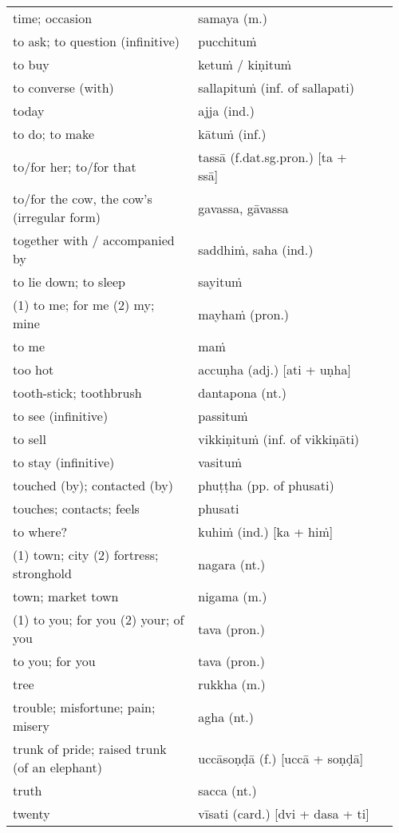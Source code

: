 \documentclass[a5paper]{memoir}
\begin{document}
\begin{longtable}{L{0.48\linewidth} L{0.48\linewidth} H}
time; occasion & samaya (m.) & \\[0pt]
to ask; to question (infinitive) & pucchituṁ & \\[0pt]
to buy & ketuṁ / kiṇituṁ & \\[0pt]
to converse (with) & sallapituṁ (inf. of sallapati) & \\[0pt]
today & ajja (ind.) & \\[0pt]
to do; to make & kātuṁ (inf.) & \\[0pt]
to/for her; to/for that & tassā (f.dat.sg.pron.) [ta + ssā] & \\[0pt]
to/for the cow, the cow's (irregular form) & gavassa, gāvassa & \\[0pt]
together with / accompanied by & saddhiṁ, saha (ind.) & \\[0pt]
to lie down; to sleep & sayituṁ & \\[0pt]
(1) to me; for me (2) my; mine & mayhaṁ (pron.) & \\[0pt]
to me & maṁ & \\[0pt]
too hot & accuṇha (adj.) [ati + uṇha] & \\[0pt]
tooth-stick; toothbrush & dantapona (nt.) & \\[0pt]
to see (infinitive) & passituṁ & \\[0pt]
to sell & vikkiṇituṁ (inf. of vikkiṇāti) & \\[0pt]
to stay (infinitive) & vasituṁ & \\[0pt]
touched (by); contacted (by) & phuṭṭha (pp. of phusati) & \\[0pt]
touches; contacts; feels & phusati & \\[0pt]
to where? & kuhiṁ (ind.) [ka + hiṁ] & \\[0pt]
(1) town; city (2) fortress; stronghold & nagara (nt.) & \\[0pt]
town; market town & nigama (m.) & \\[0pt]
(1) to you; for you (2) your; of you & tava (pron.) & \\[0pt]
to you; for you & tava (pron.) & \\[0pt]
tree & rukkha (m.) & \\[0pt]
trouble; misfortune; pain; misery & agha (nt.) & \\[0pt]
trunk of pride; raised trunk (of an elephant) & uccāsoṇḍā (f.) [uccā + soṇḍā] & \\[0pt]
truth & sacca (nt.) & \\[0pt]
twenty & vīsati (card.) [dvi + dasa + ti] & \\[0pt]

\end{longtable}
\end{document}
